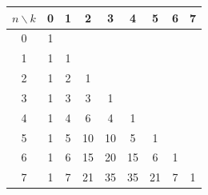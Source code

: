 \documentclass[10pt,punct]{ctexbeamer}
\begin{document}
\begin{frame}
\begin{minipage}{0.65\linewidth}
    \begin{table}[]
        \begin{tabular}{c|cccccccc}
            $n\backslash k$ & 0 & 1 & 2  & 3  & 4 & 5 & 6 & 7 \\ \hline
            0 & 1 &   &    &    &   &   & 	& \\
            1 & 1 & 1 &    &    &   &   & 	& \\
            2 & 1 & 2 &\cellcolor{green}1  &    &   &   & 	& \\
            3 & 1 & 3 & \cellcolor{green}3  & 1  &   &   &	& \\
            4 & 1 & 4 & \cellcolor{green}6  & 4  & 1 &   &  & \\
            5 & 1 & 5 & \cellcolor{green}10 & 10 & 5 & 1 & & \\
            6 & 1 & 6 & \cellcolor{green}15 & 20 & 15 & 6 & 1&  \\
            7 & 1 & 7 & 21 & \cellcolor{red}35 & 35 & 21 & 7 & 1\\
        \end{tabular}
    \end{table}
\end{minipage}
\begin{minipage}{0.3\linewidth}
    \begin{figure}
        \centering

\end{figure}
\end{minipage}
\end{frame}
\end{document}

